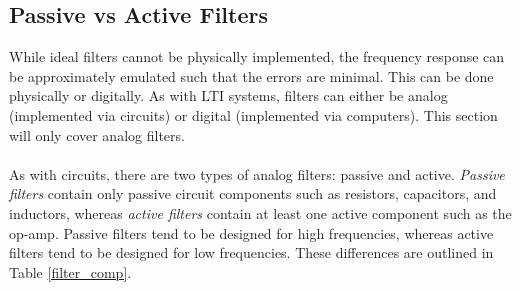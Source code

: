 \documentclass{report}
\begin{document}
\subsection{Passive vs Active Filters}
While ideal filters cannot be physically implemented, the frequency response can be approximately emulated such that the errors are minimal. This can be done physically or digitally. 
As with LTI systems, filters can either be analog (implemented via circuits) or digital (implemented via computers). This section will only cover analog filters.
\\ \\ 
As with circuits, there are two types of analog filters: passive and active. \emph{Passive filters} contain only passive circuit components such as resistors, capacitors, and inductors, whereas \emph{active filters} contain at least 
one active component such as the op-amp. Passive filters tend to be designed for high frequencies, whereas active filters tend to be designed for low frequencies. These differences are outlined in Table \ref{filter_comp}.
\begin{table}[!hbt]
    \centering
    \caption{Comparison of passive and active filters.}
    \label{filter_comp}
\end{table}
\end{document}
